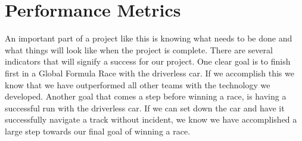 \documentclass[10pt]{article}
\begin{document}
\section{Performance Metrics}
An important part of a project like this is knowing what needs to be done and what things will look like when the project is complete. There are several indicators that will signify a success for our project. One clear goal is to finish first in a Global Formula Race with the driverless car. If we accomplish this we know that we have outperformed all other teams with the technology we developed. Another goal that comes a step before winning a race, is having a successful run with the driverless car. If we can set down the car and have it successfully navigate a track without incident, we know we have accomplished a large step towards our final goal of winning a race.







\end{document}
